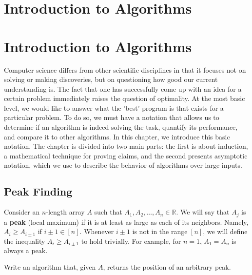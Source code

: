 
\newcommand*{\RECITATION}{}%



\ifdefined\BOOK
\chapter{Introduction to Algorithms}
\else


\chapter*{Introduction to Algorithms}
\thispagestyle{firststyle}
\fi
\ifdefined\RECITATION
\else
Computer science differs from other scientific disciplines in that it focuses not on solving or making discoveries, but on questioning how good our current understanding is. The fact that one has successfully come up with an idea for a certain problem immediately raises the question of optimality. At the most basic level, we would like to answer what the 'best' program is that exists for a particular problem. To do so, we must have a notation that allows us to determine if an algorithm is indeed solving the task, quantify its performance, and compare it to other algorithms. In this chapter, we introduce this basic notation. The chapter is divided into two main parts: the first is about induction, a mathematical technique for proving claims, and the second presents asymptotic notation, which we use to describe the behavior of algorithms over large inputs.
\fi




\section{Peak Finding}
\begin{example}
  Consider an $n$-length array $A$ such that $A_1, A_2, \ldots, A_n \in \mathbb{R}$. We will say that $A_{j}$ is a \textbf{peak} (local maximum) if it is at least as large as each of its neighbors. Namely, $A_{i} \ge A_{i\pm1}$ if $i\pm 1 \in [n]$. Whenever $i\pm 1$ is not in the range $[n]$, we will define the inequality $A_{i} \ge A_{i\pm 1}$ to hold trivially. For example, for $n=1$, $A_{1}=A_{n}$ is always a peak.

  Write an algorithm that, given $A$, returns the position of an arbitrary peak.
\end{example}


